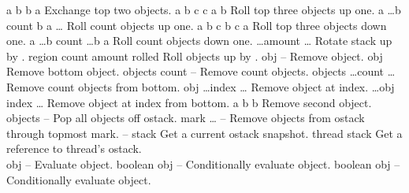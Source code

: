 \begin{longtable}{}
\hline
\optableent
	{a b}
	{{\bf {}}}
	{b a}
	{Exchange top two objects.}
\hline
\optableent
	{a b c}
	{{\bf {}}}
	{c a b}
	{Roll top three objects up one.}
\hline
\optableent
	{a \dots b count}
	{{\bf {}}}
	{b a \dots}
	{Roll count objects up one.}
\hline
\optableent
	{a b c}
	{{\bf {}}}
	{b c a}
	{Roll top three objects down one.}
\hline
\optableent
	{a \dots b count}
	{{\bf {}}}
	{\dots b a}
	{Roll count objects down one.}
\hline
\optableent
	{\dots amount}
	{{\bf {}}}
	{\dots}
	{Rotate stack up by .}
\hline
\optableent
	{region count amount}
	{{\bf {}}}
	{rolled}
	{Roll  objects up by .}
\hline
\optableent
	{obj}
	{{\bf {}}}
	{--}
	{Remove object.}
\hline
\optableent
	{obj \commas}
	{{\bf {}}}
	{\commas}
	{Remove bottom object.}
\hline
\optableent
	{objects count}
	{{\bf {}}}
	{--}
	{Remove count objects.}
\hline
\optableent
	{objects \dots count}
	{{\bf {}}}
	{\dots}
	{Remove count objects from bottom.}
\hline
\optableent
	{obj \dots index}
	{{\bf {}}}
	{\dots}
	{Remove object at index.}
\hline
\optableent
	{\dots obj \commas index}
	{{\bf {}}}
	{\dots \commas}
	{Remove object at index from bottom.}
\hline
\optableent
	{a b}
	{{\bf {}}}
	{b}
	{Remove second object.}
\hline
\optableent
	{objects}
	{{\bf {}}}
	{--}
	{Pop all objects off ostack.}
\hline
\optableent
	{mark \dots}
	{{\bf {}}}
	{--}
	{Remove objects from ostack through topmost mark.}
\hline
\optableent
	{--}
	{{\bf {}}}
	{stack}
	{Get a current ostack snapshot.}
\hline
\optableent
	{thread}
	{{\bf {}}}
	{stack}
	{Get a reference to thread's ostack.}
\hline \hline
{} \\
\hline \hline
\optableent
	{obj}
	{{\bf {}}}
	{--}
	{Evaluate object.}
\hline
\optableent
	{boolean obj}
	{{\bf {}}}
	{--}
	{Conditionally evaluate object.}
\hline
\optableent
	{boolean obj}
	{{\bf {}}}
	{--}
	{Conditionally evaluate object.}
\hline
\optableent

\end{longtable}
